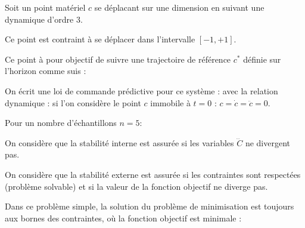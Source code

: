 \documentclass[12pt]{report}
\begin{document}
Soit un point matériel $c$ se déplacant sur une dimension en suivant une dynamique d'ordre 3. 

Ce point est contraint à se déplacer dans l'intervalle $[-1, +1]$.

Ce point à pour objectif de suivre une trajectoire de référence $c^*$ définie sur l'horizon comme suis :

On écrit une loi de commande prédictive pour ce système :
avec la relation dynamique :
si l'on considère le point $c$ immobile à $t=0$ : $c=\dot{c}=\ddot{c}=0$.

Pour un nombre d'échantillons $n=5$:


On considère que la stabilité interne est assurée si les variables $\dddot{C}$ ne divergent pas.

On considère que la stabilité externe est assurée si les contraintes sont respectées (problème solvable) et si la valeur de la fonction objectif ne diverge pas.

Dans ce problème simple, la solution du problème de minimisation est toujours aux bornes des contraintes, où la fonction objectif est minimale :
\end{document}
